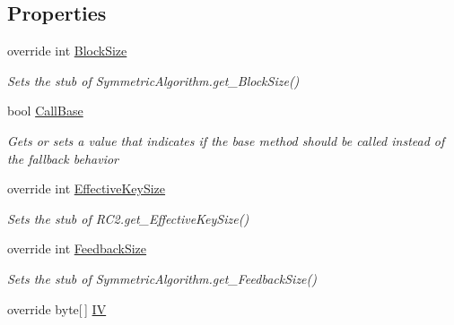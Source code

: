 \subsection*{Properties}
\begin{DoxyCompactItemize}
\item 
override int \hyperlink{class_system_1_1_security_1_1_cryptography_1_1_fakes_1_1_stub_r_c2_a4fd8ed4d8b70e5cd2741aed9266850e5}{Block\-Size}
\begin{DoxyCompactList}\small\item\em Sets the stub of Symmetric\-Algorithm.\-get\-\_\-\-Block\-Size()\end{DoxyCompactList}\item 
bool \hyperlink{class_system_1_1_security_1_1_cryptography_1_1_fakes_1_1_stub_r_c2_a2e7c5c21aee919ccae1103fcad87a51a}{Call\-Base}
\begin{DoxyCompactList}\small\item\em Gets or sets a value that indicates if the base method should be called instead of the fallback behavior\end{DoxyCompactList}\item 
override int \hyperlink{class_system_1_1_security_1_1_cryptography_1_1_fakes_1_1_stub_r_c2_ac87eb803b124be8f2e957aaceb348853}{Effective\-Key\-Size}
\begin{DoxyCompactList}\small\item\em Sets the stub of R\-C2.\-get\-\_\-\-Effective\-Key\-Size()\end{DoxyCompactList}\item 
override int \hyperlink{class_system_1_1_security_1_1_cryptography_1_1_fakes_1_1_stub_r_c2_a078f083118fd172baee225e251d4769c}{Feedback\-Size}
\begin{DoxyCompactList}\small\item\em Sets the stub of Symmetric\-Algorithm.\-get\-\_\-\-Feedback\-Size()\end{DoxyCompactList}\item 
override byte\mbox{[}$\,$\mbox{]} \hyperlink{class_system_1_1_security_1_1_cryptography_1_1_fakes_1_1_stub_r_c2_a08becb6e23acebf5b1cacccdc5979f93}{I\-V}

\end{DoxyCompactItemize}

